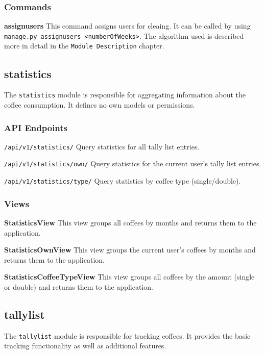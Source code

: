 \subsubsection{Commands}\label{commands}

\textbf{assignusers} This command assigns users for cleaing. It can be
called by using
\texttt{manage.py\ assignusers\ \textless{}numberOfWeeks\textgreater{}}.
The algorithm used is described more in detail in the
\texttt{Module\ Description} chapter.

\subsection{statistics}\label{statistics-1}

The \texttt{statistics} module is responsible for aggregating
information about the coffee consumption. It defines no own models or
permissions.

\subsubsection{API Endpoints}\label{api-endpoints-2}

\texttt{/api/v1/statistics/} Query statistics for all tally list
entries.

\texttt{/api/v1/statistics/own/} Query statistics for the current user's
tally list entries.

\texttt{/api/v1/statistics/type/} Query statistics by coffee type
(single/double).

\subsubsection{Views}\label{views-4}

\textbf{StatisticsView} This view groups all coffees by months and
returns them to the application.

\textbf{StatisticsOwnView} This view groups the current user's coffees
by months and returns them to the application.

\textbf{StatisticsCoffeeTypeView} This view groups all coffees by the
amount (single or double) and returns them to the application.

\subsection{tallylist}\label{tallylist}

The \texttt{tallylist} module is responsible for tracking coffees. It
provides the basic tracking functionality as well as additional
features.

